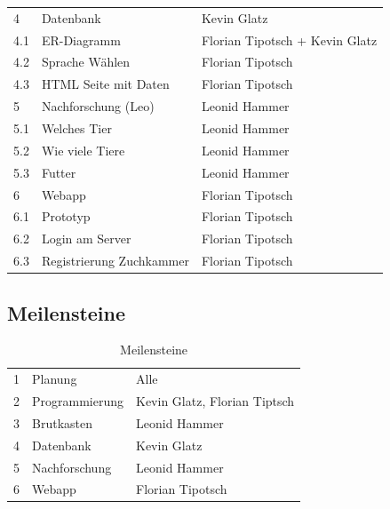 \begin{table}[H]
\begin{tabular}{lll}
		4     & Datenbank                        & Kevin Glatz                    \\
		4.1   & ER-Diagramm                      & Florian Tipotsch + Kevin Glatz \\
		4.2   & Sprache Wählen & Florian Tipotsch               \\
		4.3   & HTML Seite mit Daten             & Florian Tipotsch               \\
		5     & Nachforschung (Leo)              & Leonid Hammer                  \\
		5.1   & Welches Tier                     & Leonid Hammer                  \\
		5.2   & Wie viele Tiere                        & Leonid Hammer                  \\
		5.3   & Futter                           & Leonid Hammer                  \\
		6     & Webapp                           & Florian Tipotsch               \\
		6.1   & Prototyp                         & Florian Tipotsch               \\
		6.2   & Login am Server                  & Florian Tipotsch               \\
		6.3   & Registrierung Zuchkammer         & Florian Tipotsch              
	\end{tabular}
\end{table}

\subsection{Meilensteine}

\begin{table}[H]
	\caption{Meilensteine}
	\label{meilensteine}
	\begin{tabular}{lll}
		1   & Planung                      & Alle                         \\
		2   & Programmierung & Kevin Glatz, Florian Tiptsch \\
		3   & Brutkasten             & Leonid Hammer                \\
		4   & Datenbank                    & Kevin Glatz                  \\
		5   & Nachforschung           & Leonid Hammer                \\
		6   & Webapp                       & Florian Tipotsch            
	\end{tabular}
\end{table}

